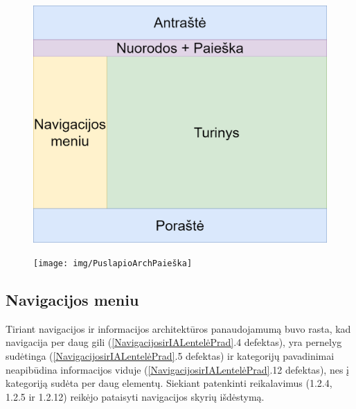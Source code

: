 \documentclass{VUMIFPSkursinis}
\begin{document}
\begin{figure}[htb]
\centering
\begin{minipage}{.5\textwidth}
  \centering
  \includegraphics[width=0.9\linewidth]{img/PuslapioArchTurinys}
  \label{img:TurinysArch}
\end{minipage}%
\begin{minipage}{.5\textwidth}
  \centering
  \texttt{[image: img/PuslapioArchPaieška]}
  \label{img:PaieškaArch}
\end{minipage}
\end{figure}

\subsection{Navigacijos meniu}
Tiriant navigacijos ir informacijos architektūros panaudojamumą buvo rasta, kad navigacija per daug gili (\ref{NavigacijosirIALentelėPrad}.4 defektas), yra pernelyg sudėtinga (\ref{NavigacijosirIALentelėPrad}.5 defektas) ir kategorijų pavadinimai neapibūdina informacijos viduje (\ref{NavigacijosirIALentelėPrad}.12 defektas), nes į kategoriją sudėta per daug elementų. Siekiant patenkinti reikalavimus (1.2.4, 1.2.5 ir 1.2.12) reikėjo pataisyti navigacijos skyrių išdėstymą.
\end{document}
